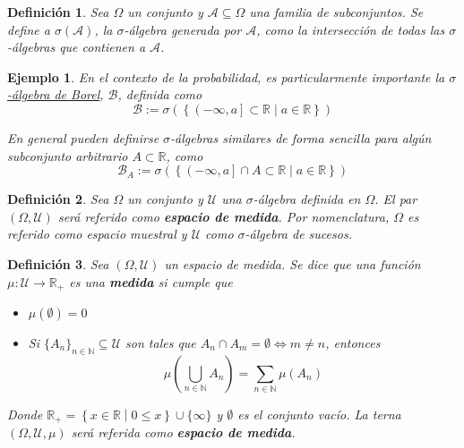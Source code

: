 \documentclass[12pt,letterpaper,draft]{book}
\newtheorem{definicion}{Definición}[chapter]
\newtheorem{ejemplo}{Ejemplo}[chapter]
\newcommand{\R}{\mathbb{R}}
\newcommand{\talque}{\mathrel{}\middle|\mathrel{}}
\begin{document}
\begin{definicion}
Sea $\Omega$ un conjunto y $\mathcal{A} \subseteq \Omega$ una familia de subconjuntos. Se define a $\sigma(\mathcal{A})$, la $\sigma$-álgebra generada por $\mathcal{A}$, como la intersección de todas las $\sigma$-álgebras que contienen a $\mathcal{A}$.
\end{definicion}

\begin{ejemplo}
En el contexto de la probabilidad, es particularmente importante la \underline{$\sigma$-álgebra de Borel}, $\mathcal{B}$, definida como
\begin{equation}
\mathcal{B} := \sigma\left( \left\{ \left( -\infty , a \right] \subset \R \talque a\in \R \right\} \right)
\end{equation}

En general pueden definirse $\sigma$-álgebras similares de forma sencilla para algún subconjunto arbitrario $A \subset \R$, como
\begin{equation}
\mathcal{B}_A := \sigma\left( \left\{ \left( -\infty , a \right] \cap A \subset \R \talque a\in \R \right\} \right)
\end{equation}
\end{ejemplo}

\begin{definicion}
Sea $\Omega$ un conjunto y $\mathcal{U}$ una $\sigma$-álgebra definida en $\Omega$. El par $(\Omega,\mathcal{U})$ será referido como \textbf{espacio de medida}. Por nomenclatura, $\Omega$ es referido como \textit{espacio muestral} y $\mathcal{U}$ como \textit{$\sigma$-álgebra de sucesos}.
\end{definicion}

\begin{definicion}%
Sea $(\Omega, \mathcal{U})$ un espacio de medida. Se dice que una función $\mu : \mathcal{U} \rightarrow \R_+$ es una \textbf{medida} si cumple que
\begin{itemize}
\item $\mu(\emptyset) = 0$
\item Si $\{ A_n \}_{n\in \mathbb{N}} \subseteq \mathcal{U}$ son tales que $A_n \cap A_m = \emptyset \Leftrightarrow m\neq n$, entonces 
\begin{equation}
\mu\left( \bigcup_{n\in \mathbb{N}} A_n \right) = \sum_{n\in \mathbb{N}} \mu(A_n)
\end{equation}
\end{itemize}
Donde $\R_+ = \left\{ x\in \R \talque 0 \leq x \right\} \cup \{ \infty \}$ y $\emptyset$ es el conjunto vacío. La terna $(\Omega,\mathcal{U},\mu)$ será referida como \textbf{espacio de medida}.
\label{medida}
\end{definicion}
\end{document}
